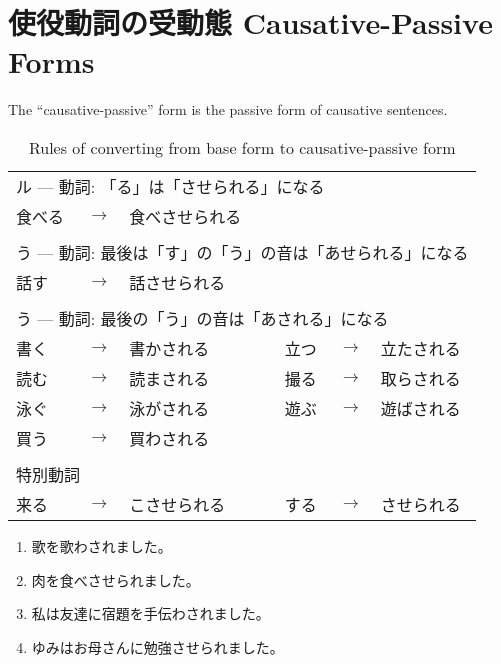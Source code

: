 \documentclass[notoc,notitlepage]{tufte-book}
\begin{document}

\section{使役動詞の受動態 Causative-Passive Forms}%
\label{sec:shiekidoushi_no_jyudoudai_causative_passive_forms}

The ``causative-passive'' form is the passive form of causative sentences.

\begin{table}[ht]
  \centering
  \caption{Rules of converting from base form to causative-passive form}
  \label{table:rules_of_converting_from_base_form_to_causative_passive_form}
  \begin{tabular}{l c l c l c l}
  \multicolumn{7}{l}{ル --- 動詞: 「る」は「させられる」になる} \\
  食べる & $\to$ & 食べさせられる &  &  &  &  \\
  $  $ \\
  \multicolumn{7}{l}{う --- 動詞: 最後は「す」の「う」の音は「あせられる」になる} \\
  話す & $\to$ & 話させられる \\
  $  $ \\
  \multicolumn{7}{l}{う --- 動詞: 最後の「う」の音は「あされる」になる} \\
  書く & $\to$ & 書かされる & & 立つ & $\to$ & 立たされる \\
  読む & $\to$ & 読まされる & & 撮る & $\to$ & 取らされる \\
  泳ぐ & $\to$ & 泳がされる & & 遊ぶ & $\to$ & 遊ばされる \\
  買う & $\to$ & 買わされる \\
  $  $ \\
  \multicolumn{7}{l}{特別動詞} \\
  来る & $\to$ & こさせられる & & する & $\to$ & させられる
  \end{tabular}
\end{table}


\begin{eg}
  \begin{enumerate}
    \item 歌を歌わされました。
    \item 肉を食べさせられました。
    \item 私は友達に宿題を手伝わされました。
    \item ゆみはお母さんに勉強させられました。
  \end{enumerate}
\end{eg}
\end{document}
